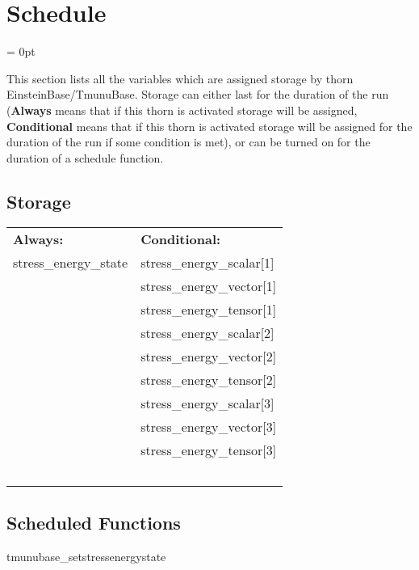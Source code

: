 
\section{Schedule} 


\parskip = 0pt


\noindent This section lists all the variables which are assigned storage by thorn EinsteinBase/TmunuBase.  Storage can either last for the duration of the run ({\bf Always} means that if this thorn is activated storage will be assigned, {\bf Conditional} means that if this thorn is activated storage will be assigned for the duration of the run if some condition is met), or can be turned on for the duration of a schedule function.


\subsection*{Storage}

\hspace{5mm}

 \begin{tabular*}{160mm}{ll} 

{\bf Always:}& {\bf Conditional:} \\ 
 stress\_energy\_state &  stress\_energy\_scalar[1]\\ 
~ &  stress\_energy\_vector[1]\\ 
~ &  stress\_energy\_tensor[1]\\ 
~ &  stress\_energy\_scalar[2]\\ 
~ &  stress\_energy\_vector[2]\\ 
~ &  stress\_energy\_tensor[2]\\ 
~ &  stress\_energy\_scalar[3]\\ 
~ &  stress\_energy\_vector[3]\\ 
~ &  stress\_energy\_tensor[3]\\ 
~ & ~\\ 
\end{tabular*} 


\subsection*{Scheduled Functions}
\vspace{5mm}


\hspace{5mm} tmunubase\_setstressenergystate 

\hspace{5mm}{\it set the stress\_energy\_state variable } 


